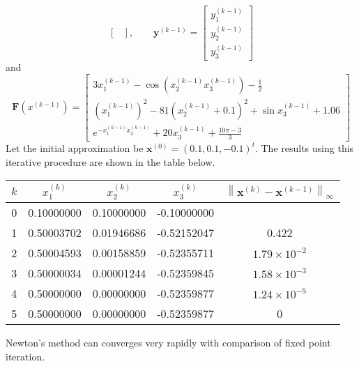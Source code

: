 \documentclass[../main-sheet.tex]{subfiles}
\begin{document}
\begin{ex}
\[\begin{bmatrix}
        \end{bmatrix},\qquad
        \mathbf{y}^{(k-1)}=\begin{bmatrix}
            y_1^{(k-1)}\\
            y_2^{(k-1)}\\
            y_3^{(k-1)}
        \end{bmatrix}\]
        and\[
        \mathbf{F}\left( x^{(k-1)} \right)=\begin{bmatrix}
            3x_1^{(k-1)}-\cos\left(x_2^{(k-1)}x_3^{(k-1)}\right)-\frac{1}{2}\\
        \left(x_1^{(k-1)}\right)^2-81\left(x_2^{(k-1)}+0.1\right)^2+\sin x_3^{(k-1)}+1.06\\
        e^{-x_1^{(k-1)}x_2^{(k-1)}}+20x_3^{(k-1)}+\frac{10\pi -3}{3}
        \end{bmatrix}
    \]
    Let the initial approximation be \(\mathbf{x}^{(0)}=(0.1,0.1,-0.1)^t\). The results using this iterative procedure are shown in the table below.
    \begin{table}[H]
        \centering
        \begin{tabular}{clllc}
            \toprule
            \(k\) & \multicolumn{1}{c}{\(x_1^{(k)}\)} & \multicolumn{1}{c}{\(x_2^{(k)}\)} & \multicolumn{1}{c}{\(x_3^{(k)}\)} & \(\left\|\mathbf{x}^{(k)}-\mathbf{x}^{(k-1)}\right\|_\infty\)\\\midrule
            0 & 0.10000000 & 0.10000000 & -0.10000000 & \\
            1 & 0.50003702 & 0.01946686 & -0.52152047 & 0.422 \\
            2 & 0.50004593 & 0.00158859 & -0.52355711 & \(1.79\times 10^{-2}\) \\
            3 & 0.50000034 & 0.00001244 & -0.52359845 & \(1.58\times 10^{-3}\) \\
            4 & 0.50000000 & 0.00000000 & -0.52359877 & \(1.24\times 10^{-5}\) \\
            5 & 0.50000000 & 0.00000000 & -0.52359877 & 0 \\
            \bottomrule
        \end{tabular}
    \end{table}
\end{ex}
Newton's method can converges very rapidly with comparison of fixed point iteration.
\end{document}
